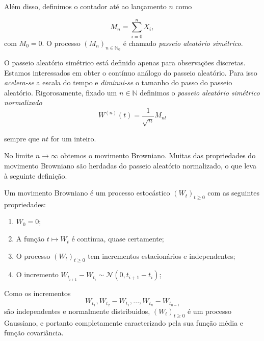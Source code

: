 \documentclass{article}
\begin{document}
\noindent Além disso, definimos o contador até ao lançamento $n$ como

\begin{equation*}
    M_n= \sum_{i=0}^nX_i,
\end{equation*}
com $M_0=0$. O processo $(M_n)_{n \in \mathbb{N}_0}$ é chamado \textit{passeio aleatório simétrico}.

\vspace{0.5cm}

O passeio aleatório simétrico está definido apenas para  observações discretas. Estamos interessados em obter o contínuo análogo do passeio aleatório. Para isso \textit{acelera-se} a escala do tempo e \textit{diminui-se} o tamanho do passo do passeio aleatório. Rigorosamente, fixado um $n \in \mathbb{N}$ definimos o \textit{passeio aleatório simétrico normalizado }
\begin{equation*}
    W^{(n)}(t) = \frac{1}{\sqrt{n}}M_{nt}
\end{equation*}

sempre que $nt$ for um inteiro.

\vspace{1cm}

No limite $n \rightarrow \infty$ obtemos o movimento Browniano. Muitas das propriedades do movimento Browniano são herdadas do passeio aleatório normalizado, o que leva à seguinte definição.

\vspace{0.5cm}

\begin{dfn}
    Um movimento Browniano é um processo estocástico $(W_t)_{t \geq 0}$ com as seguintes propriedades:
    \begin{enumerate}
        \item $W_0=0$;
        \item A função $t \mapsto W_t$ é contínua, quase certamente;
        \item O processo $(W_t)_{t \geq 0}$ tem incrementos estacionários e independentes;
        \item O incremento $W_{t_{i+1}}-W_{t_i} \sim \mathcal{N}(0,t_{i+1}-t_i)$;
    \end{enumerate}
\end{dfn}

\vspace{1cm}

Como os incrementos 
\begin{equation*}
    W_{t_1},W_{t_2}-W_{t_1},...,W_{t_n}-W_{t_{n-1}}
\end{equation*}
são independentes e normalmente distribuidos, $(W_t)_{t \geq 0}$ é um processo Gaussiano, e portanto completamente caracterizado pela sua função média e função covariância.\\
\end{document}
